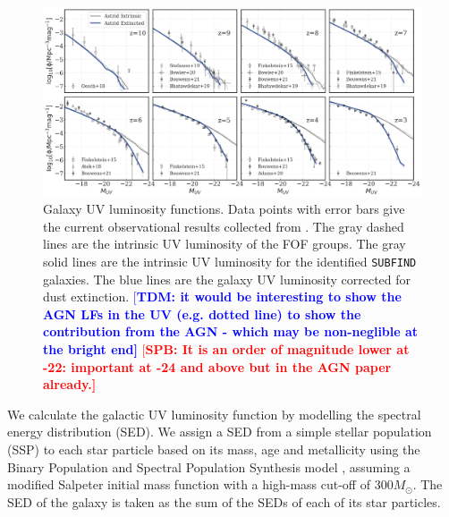\documentclass[fleqn,usenatbib]{mnras}
\def\astrid{\texttt{Astrid} }
\newcommand{\spb}[1]{\textcolor{red}{[\bf SPB: #1]}}
\newcommand{\tiziana}[1]{\textcolor{blue}{[\bf TDM: #1]}}
\begin{document}
\begin{figure}
\centering
  \includegraphics[width=1.0\textwidth]{plots/UVLF-subfind-z10-z3.png}
  \caption{Galaxy UV luminosity functions. Data points with error bars give the current observational results collected from \citet{Bouwens2015,Atek2015,Atek2018,Finkelstein2015,Bhatawdekar2019,Stefanon2019,Adams2020,Bowler2020,Bouwens2021}.
  The gray dashed lines are the intrinsic UV luminosity of the FOF groups.
  The gray solid lines are the intrinsic UV luminosity for the identified \texttt{SUBFIND} galaxies.
  The blue lines are the galaxy UV luminosity corrected for dust extinction.
 \tiziana{it would be interesting to show the AGN LFs in the UV (e.g. dotted line) to show the contribution from the AGN - which may be non-neglible at the bright end} \spb{It is an order of magnitude lower at -22: important at -24 and above but in the AGN paper already.} }
  \label{fig:UVLF}
\end{figure}

We calculate the galactic UV luminosity function by modelling the spectral energy distribution (SED).
We assign a SED from a simple stellar population (SSP) to each star particle based on its mass, age and metallicity using the Binary Population and Spectral Population Synthesis model \citep[BPASS, version 2.2;][]{Stanway2018}, assuming a modified Salpeter initial mass function with a high-mass cut-off of $300M_\odot$.
The SED of the galaxy is taken as the sum of the SEDs of each of its star particles.
\end{document}
